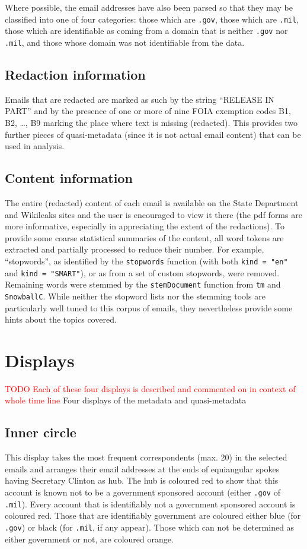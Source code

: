 \documentclass[journal]{vgtc}                %
\newcommand*{\TODO}[1]{\textcolor{red}{TODO #1}}
\begin{document}
Where possible, the email addresses have also been parsed so that they may be classified into one of four categories: those which are \texttt{.gov},  those which are \texttt{.mil},  those which are identifiable as coming from a domain that is neither  \texttt{.gov} nor  \texttt{.mil}, and those whose domain was not identifiable from the data.
\subsection{Redaction information}
\label{sect:data:redact}
Emails that are redacted are marked as such by the string ``RELEASE IN PART'' and by the presence of one or more of nine FOIA exemption codes B1, B2, \ldots, B9  marking the place where text is missing (redacted).  This provides two further pieces of quasi-metadata (since it is not actual email content) that can be used in analysis.
\subsection{Content information}
\label{sect:data:contentinfo}
The entire (redacted) content of each email is available on the State Department and Wikileaks sites and the user is encouraged to view it there (the pdf forms are more informative, especially in appreciating the extent of the redactions).  To provide some coarse statistical summaries of the content, all word tokens are extracted and partially processed to reduce their number.  For example,  ``stopwords'', as identified by the \texttt{stopwords} function (with both  \texttt{kind = "en"} and  \texttt{kind = "SMART"}), or as from a set of custom stopwords, were removed.  Remaining words were stemmed by the \texttt{stemDocument} function from \texttt{tm} and \texttt{SnowballC}.   While neither the stopword lists nor the stemming tools are particularly well tuned to this corpus of emails, they nevertheless provide some hints about the topics covered.  

\section{Displays}
\label{sect:Displays}
\TODO{Each of these four displays is described and commented on in context of whole time line}
Four displays of the metadata and quasi-metadata 

\subsection{Inner circle}
\label{sect:Displays:circle} 
This display takes the most frequent correspondents (max. 20) in the selected emails and arranges their email addresses  at the ends of  equiangular spokes having Secretary Clinton as hub.  The hub is coloured red to show that this account is known not to be a government sponsored account (either \texttt{.gov} of \texttt{.mil}).  Every account that is identifiably not a government sponsored account is coloured red.  Those that are identifiably government are coloured either blue (for \texttt{.gov}) or black (for \texttt{.mil}, if any appear).  Those which can not be determined as either government or not, are coloured orange.
\end{document}
